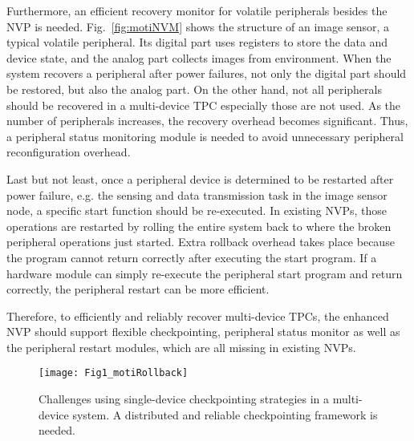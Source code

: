 Furthermore, an efficient recovery monitor for volatile peripherals besides the NVP is needed.
Fig.~\ref{fig:motiNVM} shows the structure of an image sensor, a typical volatile peripheral.
Its digital part uses registers to store the data and device state, and the analog part collects images from environment.
When the system recovers a peripheral after power failures, not only the digital part should be restored, but also the analog part. 
On the other hand, not all peripherals should be recovered in a multi-device TPC especially those are not used. 
As the number of peripherals increases, the recovery overhead becomes significant. 
Thus, a peripheral status monitoring module is needed to avoid unnecessary peripheral reconfiguration overhead.

Last but not least, once a peripheral device is determined to be restarted after power failure, e.g. the sensing and data transmission task in the image sensor node, a specific start function should be re-executed. 
In existing NVPs, those operations are restarted by rolling the entire system back to where the broken peripheral operations just started. Extra rollback overhead takes place because the program cannot return correctly after executing the start program. If a hardware module can simply re-execute the peripheral start program and return correctly, the peripheral restart can be more efficient.

Therefore, to efficiently and reliably recover multi-device TPCs, the enhanced NVP should support flexible checkpointing, peripheral status monitor as well as the peripheral restart modules, which are all missing in existing NVPs.

%   
\begin{figure}[t]
    \centering
    \texttt{[image: Fig1\_motiRollback]}
    \vspace{-12pt}
    \caption{Challenges using single-device checkpointing strategies in a multi-device system. A distributed and reliable checkpointing framework is needed.}
    \vspace{-5pt}
    \label{fig:motiRollback}
\end{figure}

